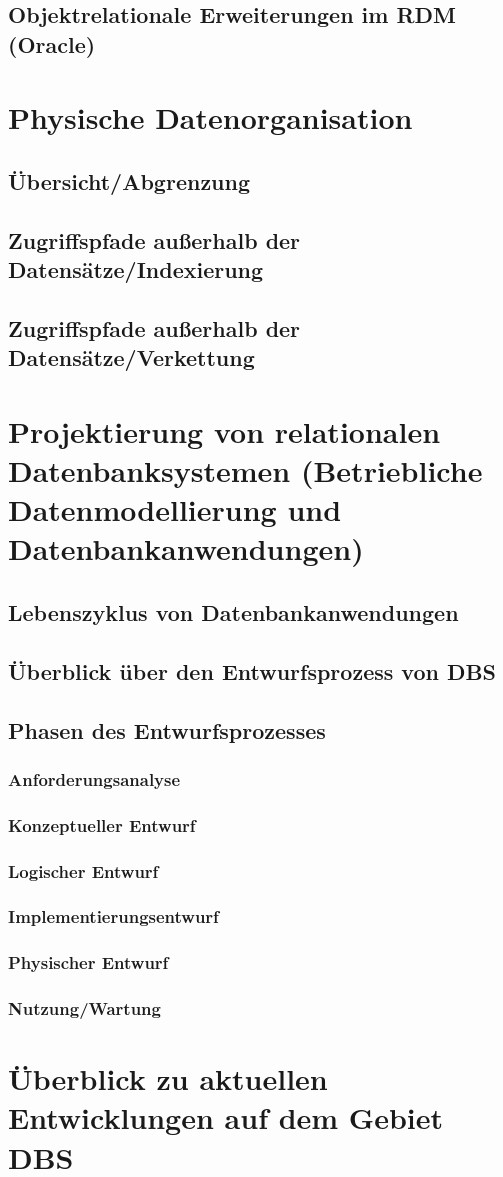 \section{Objektrelationale Erweiterungen im RDM (Oracle)}

\chapter{Physische Datenorganisation}
\section{Übersicht/Abgrenzung}
\section{Zugriffspfade außerhalb der Datensätze/Indexierung}
\section{Zugriffspfade außerhalb der Datensätze/Verkettung}

\chapter{Projektierung von relationalen Datenbanksystemen (Betriebliche Datenmodellierung und Datenbankanwendungen)}
\section{Lebenszyklus von Datenbankanwendungen}
\section{Überblick über den Entwurfsprozess von DBS}
\section{Phasen des Entwurfsprozesses}
\subsection{Anforderungsanalyse}
\subsection{Konzeptueller Entwurf}
\subsection{Logischer Entwurf}
\subsection{Implementierungsentwurf}
\subsection{Physischer Entwurf}
\subsection{Nutzung/Wartung}

\chapter{Überblick zu aktuellen Entwicklungen auf dem Gebiet DBS}


